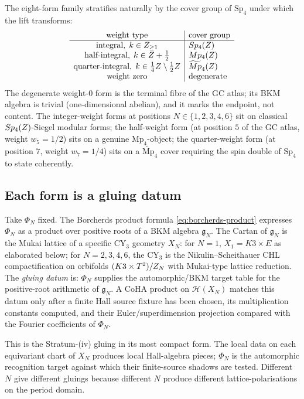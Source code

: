 The eight-form family stratifies naturally by the cover group of $\mathrm{Sp}_4$ under which the lift transforms:
\[
  \begin{array}{c|l}
    \text{weight type} & \text{cover group} \\
    \hline
    \text{integral}, \; k \in Z_{\geq 1} & Sp_4(Z) \\
    \text{half-integral}, \; k \in Z + \tfrac12 & Mp_4(Z) \\
    \text{quarter-integral}, \; k \in \tfrac14 Z \setminus \tfrac12 Z & \widetilde{Mp}_4(Z) \\
    \text{weight zero} & \text{degenerate}
  \end{array}
\]
The degenerate weight-$0$ form is the terminal fibre of the GC atlas; its BKM algebra is trivial (one-dimensional abelian), and it marks the endpoint, not content. The integer-weight forms at positions $N \in \{1, 2, 3, 4, 6\}$ sit on classical $Sp_4(Z)$-Siegel modular forms; the half-weight form (at position $5$ of the GC atlas, weight $w_5 = 1/2$) sits on a genuine $\mathrm{Mp}_4$-object; the quarter-weight form (at position $7$, weight $w_7 = 1/4$) sits on a $\widetilde{\mathrm{Mp}}_4$ cover requiring the spin double of $\mathrm{Sp}_4$ to state coherently.

\subsection{Each form is a gluing datum}

Take $\Phi_N$ fixed. The Borcherds product formula \eqref{eq:borcherds-product} expresses $\Phi_N$ as a product over positive roots of a BKM algebra $\mathfrak g_N$. The Cartan of $\mathfrak g_N$ is the Mukai lattice of a specific CY$_3$ geometry $X_N$: for $N = 1$, $X_1 = K3 \times E$ as elaborated below; for $N = 2, 3, 4, 6$, the CY$_3$ is the Nikulin--Scheithauer CHL compactification on orbifolds $(K3 \times T^2) / Z_N$ with Mukai-type lattice reduction. The \emph{gluing datum} is: $\Phi_N$ supplies the automorphic/BKM target table for the positive-root arithmetic of $\mathfrak g_N$. A CoHA product on $\mathcal H(X_N)$ matches this datum only after a finite Hall source fixture has been chosen, its multiplication constants computed, and their Euler/superdimension projection compared with the Fourier coefficients of $\Phi_N$.

This is the Stratum-(iv) gluing in its most compact form. The local data on each equivariant chart of $X_N$ produces local Hall-algebra pieces; $\Phi_N$ is the automorphic recognition target against which their finite-source shadows are tested. Different $N$ give different gluings because different $N$ produce different lattice-polarisations on the period domain.

